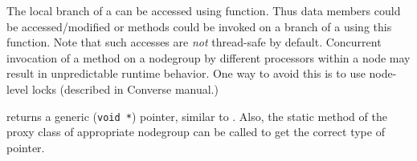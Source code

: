 The local branch of a 
can be accessed using 
function. Thus data members could be accessed/modified or methods could be
invoked on a branch of a  using this function. Note
that such accesses are {\em not} thread-safe by default. Concurrent invocation
of a method on a nodegroup by different processors within a
node may result in unpredictable runtime behavior.  One way to avoid this is to
use node-level locks (described in Converse manual.)

 returns a generic
({\tt void *}) pointer, similar to .  Also, the static
method  of the proxy class of appropriate
nodegroup can be called to get the correct type of
pointer.
